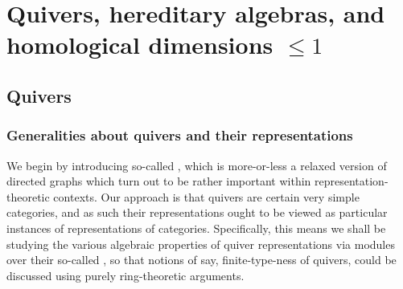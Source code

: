 \section{Quivers, hereditary algebras, and homological dimensions \texorpdfstring{$\leq 1$}{}}
    \subsection{Quivers}
        \subsubsection{Generalities about quivers and their representations}
            We begin by introducing so-called , which is more-or-less a relaxed version of directed graphs which turn out to be rather important within representation-theoretic contexts. Our approach is that quivers are certain very simple categories, and as such their representations ought to be viewed as particular instances of representations of categories. Specifically, this means we shall be studying the various algebraic properties of quiver representations via modules over their so-called , so that notions of say, finite-type-ness of quivers, could be discussed using purely ring-theoretic arguments.
        

